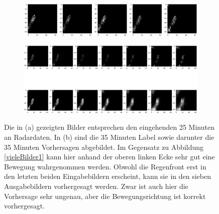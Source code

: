 \begin{figure}[]
	\centering
	\begin{subfigure}[]{\linewidth} 
		\centering
		\includegraphics[width=0.9\linewidth]{pics/dt5.png}
		\caption[]{}\label{ga}
	\end{subfigure}
	
	\begin{subfigure}[]{\linewidth} 
		\centering
		\includegraphics[width=\linewidth]{pics/t5.png}
		\caption[]{}\label{gb}
	\end{subfigure}
	
	\caption[Validierungsdaten und Label sowie Vorhersage 2]{Die in (a) gezeigten Bilder entsprechen den eingehenden 25 Minuten an Radardaten. In (b) sind die 35 Minuten Label sowie darunter die 35 Minuten Vorhersagen abgebildet. Im Gegensatz zu Abbildung \ref{vieleBilder1} kann hier anhand der oberen linken Ecke sehr gut eine Bewegung wahrgenommen werden. Obwohl die Regenfront erst in den letzten beiden Eingabebildern erscheint, kann sie in den sieben Ausgabebildern vorhergesagt werden. Zwar ist auch hier die Vorhersage sehr ungenau, aber die Bewegungsrichtung ist korrekt vorhergesagt.}
	\label{vieleBilder2}
\end{figure}



